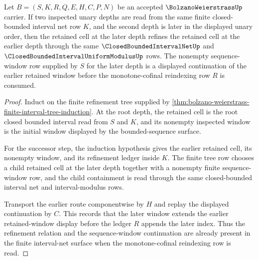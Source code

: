 \begin{theorem}
\label{thm:bolzano-weierstrass-retained-cell-monotonicity}
Let $B=(S,K,R,Q,E,H,C,P,N)$ be an accepted $\BolzanoWeierstrassUp$ carrier. If two inspected unary depths are read from the same finite closed-bounded interval net row $K$, and the second depth is later in the displayed unary order, then the retained cell at the later depth refines the retained cell at the earlier depth through the same $\ClosedBoundedIntervalNetUp$ and $\ClosedBoundedIntervalUniformModulusUp$ rows. The nonempty sequence-window row supplied by $S$ for the later depth is a displayed continuation of the earlier retained window before the monotone-cofinal reindexing row $R$ is consumed.
\end{theorem}
\begin{proof}
Induct on the finite refinement tree supplied by \autoref{thm:bolzano-weierstrass-finite-interval-tree-induction}. At the root depth, the retained cell is the root closed bounded interval read from $S$ and $K$, and its nonempty inspected window is the initial window displayed by the bounded-sequence surface.

For the successor step, the induction hypothesis gives the earlier retained cell, its nonempty window, and its refinement ledger inside $K$. The finite tree row chooses a child retained cell at the later depth together with a nonempty finite sequence-window row, and the child containment is read through the same closed-bounded interval net and interval-modulus rows.

Transport the earlier route componentwise by $H$ and replay the displayed continuation by $C$. This records that the later window extends the earlier retained-window display before the ledger $R$ appends the later index. Thus the refinement relation and the sequence-window continuation are already present in the finite interval-net surface when the monotone-cofinal reindexing row is read.
\end{proof}

